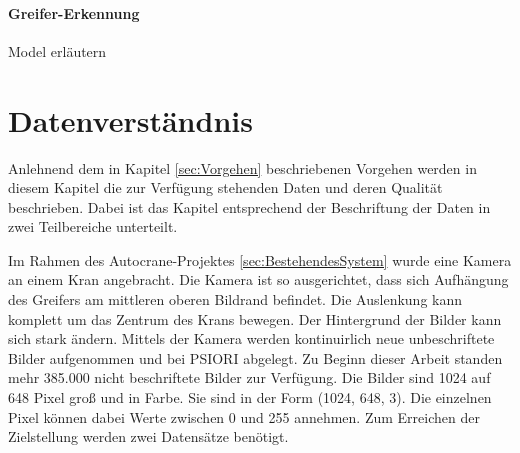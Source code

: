 	\paragraph{Greifer-Erkennung} Model erläutern 

	\section{Datenverständnis}
	\label{sec:DataUnderstanding}
	Anlehnend dem in Kapitel \ref{sec:Vorgehen} beschriebenen Vorgehen  werden in diesem Kapitel die zur Verfügung stehenden Daten und deren Qualität beschrieben. Dabei ist das Kapitel entsprechend der Beschriftung der Daten in zwei Teilbereiche unterteilt.
	
	Im Rahmen des Autocrane-Projektes \ref{sec:BestehendesSystem}  wurde eine Kamera an einem Kran angebracht. Die Kamera ist so ausgerichtet, dass sich Aufhängung des Greifers am mittleren oberen Bildrand befindet. Die Auslenkung kann komplett um das Zentrum des Krans bewegen. Der Hintergrund der Bilder kann sich stark ändern. Mittels der Kamera werden kontinuirlich neue unbeschriftete Bilder aufgenommen und bei PSIORI abgelegt. Zu Beginn dieser Arbeit standen mehr 385.000 nicht beschriftete Bilder zur Verfügung. Die Bilder sind 1024 auf 648 Pixel groß und in Farbe. Sie sind in der Form (1024, 648, 3). Die einzelnen Pixel können dabei Werte zwischen 0 und 255 annehmen. 
	Zum Erreichen der Zielstellung werden zwei Datensätze benötigt.
	
